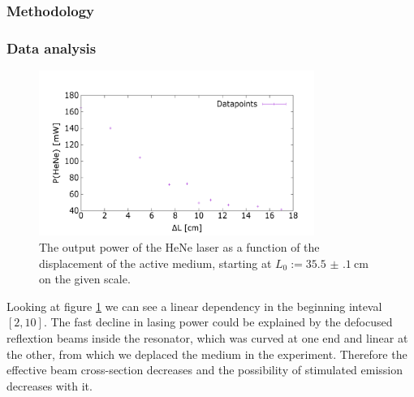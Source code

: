 \documentclass[../main.tex]{subfiles}
\begin{document}
\subsubsection*{Methodology}
\subsubsection*{Data analysis}

    \begin{figure}
        \centering
        \includegraphics[width=0.8\textwidth]{Bilddateien/3/P(HeNe)overDx.png}
        \caption{The output power of the HeNe laser as a function of the displacement of the active medium, starting at $L_0:=\SI{35.5(1)}{\cm}$ on the given scale.}
        \label{fig:output_power_over_displacement}
    \end{figure}

    Looking at figure \ref{fig:output_power_over_displacement} we can see a linear dependency in the beginning inteval $[2,10]$. The fast decline in lasing power could be explained by the defocused reflextion beams inside the resonator, which was curved at one end and linear at the other, from which we deplaced the medium in the experiment. Therefore the effective beam cross-section decreases and the possibility of stimulated emission decreases with it.
\end{document}

